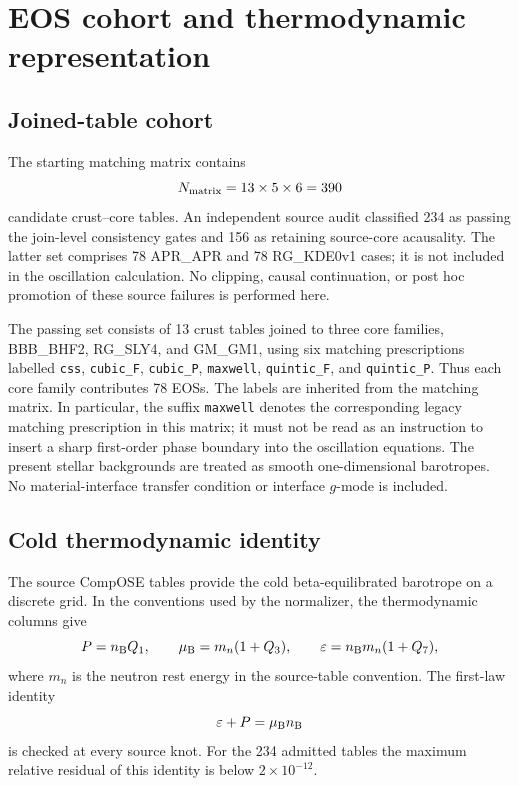 \documentclass[aps,prd,twocolumn,superscriptaddress,nofootinbib]{revtex4-2}
\newcommand{\eps}{\varepsilon}
\newcommand{\mub}{\mu_{\rm B}}
\newcommand{\nb}{n_{\rm B}}
\begin{document}
\section{EOS cohort and thermodynamic representation}

\subsection{Joined-table cohort}

The starting matching matrix contains
\begin{equation}
N_{\rm matrix}=13\times 5\times 6=390
\end{equation}
candidate crust--core tables. An independent source audit classified 234 as passing the join-level consistency gates and 156 as retaining source-core acausality. The latter set comprises 78 APR\_APR and 78 RG\_KDE0v1 cases; it is not included in the oscillation calculation. No clipping, causal continuation, or post hoc promotion of these source failures is performed here.

The passing set consists of 13 crust tables joined to three core families, BBB\_BHF2, RG\_SLY4, and GM\_GM1, using six matching prescriptions labelled \texttt{css}, \texttt{cubic\_F}, \texttt{cubic\_P}, \texttt{maxwell}, \texttt{quintic\_F}, and \texttt{quintic\_P}. Thus each core family contributes 78 EOSs. The labels are inherited from the matching matrix. In particular, the suffix \texttt{maxwell} denotes the corresponding legacy matching prescription in this matrix; it must not be read as an instruction to insert a sharp first-order phase boundary into the oscillation equations. The present stellar backgrounds are treated as smooth one-dimensional barotropes. No material-interface transfer condition or interface $g$-mode is included.

\subsection{Cold thermodynamic identity}

The source CompOSE tables provide the cold beta-equilibrated barotrope on a discrete grid. In the conventions used by the normalizer, the thermodynamic columns give
\begin{equation}
P=\nb Q_1,\qquad
\mub=m_n(1+Q_3),\qquad
\eps=\nb m_n(1+Q_7),
\label{eq:compose}
\end{equation}
where $m_n$ is the neutron rest energy in the source-table convention. The first-law identity
\begin{equation}
\eps+P=\mub\nb
\label{eq:firstlaw}
\end{equation}
is checked at every source knot. For the 234 admitted tables the maximum relative residual of this identity is below $2\times10^{-12}$.
\end{document}
